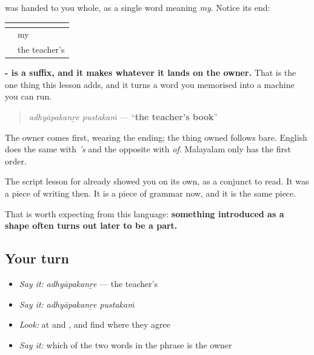 \begin{grammarlens}[title={Grammar Lens: the ending was there all along}]
\textbf{} was handed to you whole, as a single word meaning \emph{my}. Notice its end:

\noindent
\begin{tabularx}{\linewidth}{@{}>{\raggedright\arraybackslash}X>{\raggedright\arraybackslash}X@{}}
\toprule
\textbf{} & \textbf{} \\
\midrule
\ml{എ}\textbf{\ml{ന്റെ}} & my \\
\ml{അധ്യാപക}\textbf{\ml{ന്റെ}} & the teacher's \\
\bottomrule
\end{tabularx}

\textbf{- is a suffix, and it makes whatever it lands on the owner.} That is the one thing this lesson adds, and it turns a word you memorised into a machine you can run.

\begin{quote}
\textbf{ }
\end{quote}

\begin{quote}
\emph{adhyāpakanṟe pustakaṁ} — \textquotedblleft{}\textbf{the teacher's book}\textquotedblright{}
\end{quote}

The owner comes first, wearing the ending; the thing owned follows bare. English does the same with \emph{'s} and the opposite with \emph{of}. Malayalam only has the first order.
\end{grammarlens}

\begin{cousinweb}
The script lesson for \textbf{} already showed you \textbf{} on its own, as a conjunct to read. It was a piece of writing then. It is a piece of grammar now, and it is the same piece.

That is worth expecting from this language: \textbf{something introduced as a shape often turns out later to be a part.}
\end{cousinweb}

\subsection*{Your turn}
\begin{itemize}
\raggedright
  \item \emph{Say it:} \emph{adhyāpakanṟe} — the teacher's
  \item \emph{Say it:} \emph{adhyāpakanṟe pustakaṁ}
  \item \emph{Look:} at \textbf{} and \textbf{}, and find where they agree
  \item \emph{Say it:} which of the two words in the phrase is the owner
\end{itemize}


